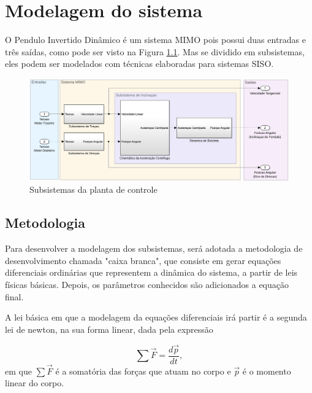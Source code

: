 \chapter{Modelagem do sistema}  \label{chp:modelagem}
    
    O Pendulo Invertido Dinâmico é um sistema MIMO pois possui duas entradas e três saídas, como pode ser visto na Figura \ref{subsistemas}. Mas se dividido em subsistemas, eles podem ser modelados com técnicas elaboradas para sistemas SISO.
    
    \begin{figure}[h]
        \centering
        \includegraphics[width=15cm]{Imagens/sistemasMIMO.png}
        \caption{Subsistemas da planta de controle}
        \label{subsistemas}
    \end{figure}
        
	\section{Metodologia}
		Para desenvolver a modelagem dos subsistemas, será adotada a metodologia de desenvolvimento chamada "caixa branca", que consiste em gerar equações diferenciais ordinárias que representem a dinâmica do sistema, a partir de leis físicas básicas. Depois, os parâmetros conhecidos são adicionados a equação final.~\cite{book:dorf}
		
		A lei básica em que a modelagem da equações diferenciais irá partir é a segunda lei de newton, na sua forma linear, dada pela expressão
        
        \begin{equation}
            \sum \vec F  = \frac{d \vec p}{dt},
            \label{SegundaLeiDeNewton}
        \end{equation}
		em que $\sum \vec F$ é a somatória das forças que atuam no corpo e $\vec p$ é o momento linear do corpo.
		
